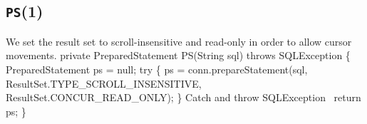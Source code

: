 \documentclass{article}
\def\nwendcode{\endtrivlist \endgroup}
\let\nwdocspar=\par
\theoremstyle{definition}
\begin{document}
\subsection{{\tt{}\protect{}PS}(1)}
We set the result set to scroll-insensitive and read-only in order to allow
cursor movements.
\nwenddocs{}\endmoddef{}
private PreparedStatement PS(String sql) throws SQLException \{
  PreparedStatement ps = null;
  try \{
    ps = conn.prepareStatement(sql,
      ResultSet.TYPE_SCROLL_INSENSITIVE, ResultSet.CONCUR_READ_ONLY);
  \}
  \LA{}Catch and throw \code{}SQLException\edoc{}~{\nwtagstyle{}}\RA{}
  return ps;
\}
\eatline
{}\nwendcode{}\nwdocspar
\end{document}
